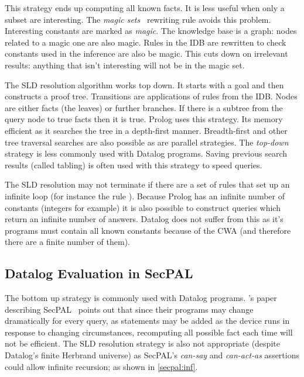 \documentclass[a4paper,sfsidenotes]{%
  scrartcl%
}
\begin{document}
This strategy ends up computing all known facts. It is less useful when only a
subset are interesting.  The \emph{magic sets}~\cite{Bancilhon:1985cz} rewriting
rule avoids this problem.  Interesting constants are marked as \emph{magic}. The
knowledge base is a graph: nodes related to a magic one are also magic.  Rules
in the \ac{IDB} are rewritten to check constants used in the inference are also
be magic.  This cuts down on irrelevant results: anything that isn't
interesting will not be in the magic set.

The \ac{SLD} resolution algorithm works top down. It starts with a goal and then
constructs a proof tree. Transitions are applications of rules from the
\ac{IDB}. Nodes are either facts (the leaves) or further branches.  If there is
a subtree from the query node to true facts then it is true.  Prolog uses this
strategy.  Its memory efficient as it searches the tree in a depth-first manner.
Breadth-first and other tree traversal searches are also possible as are
parallel strategies.  The \emph{top-down} strategy is less commonly used with
Datalog programs. Saving previous search results (called tabling) is often used
with this strategy to speed queries.


The \ac{SLD} resolution may not terminate if there are a set of rules that set
up an infinite loop (for instance the rule ).  Because
Prolog has an infinite number of constants (integers for example) it is also
possible to construct queries which return an infinite number of answers.
Datalog does not suffer from this as it's programs must contain all known
constants because of the \ac{CWA} (and therefore there are a finite number of
them).


\subsection{Datalog Evaluation in SecPAL}

The bottom up strategy is commonly used with Datalog programs.
\citeauthor*{Becker:2009vt}'s paper describing SecPAL~\cite{Becker:2006vh}
points out that since their programs may change dramatically for every query, as
statements may be added as the device runs in response to changing
circumstances, recomputing all possible fact each time  will not be efficient.
The \ac{SLD} resolution strategy is also not appropriate (despite Datalog's
finite Herbrand universe) as SecPAL's \emph{can-say} and \emph{can-act-as}
assertions could allow infinite recursion; as shown in \autoref{secpal:inf}.
\end{document}
